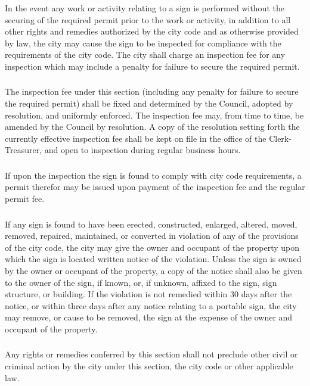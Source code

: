\subsubsection{}
In the event any work or activity relating to a sign is performed without the securing of the required permit prior to the work or activity, in addition to all other rights and remedies authorized by the city code and as otherwise provided by law, the city may cause the sign to be inspected for compliance with the requirements of the city code.  The city shall charge an inspection fee for any inspection which may include a penalty for failure to secure the required permit.
\subsubsection{}
The inspection fee under this section (including any penalty for failure to secure the required permit) shall be fixed and determined by the Council, adopted by resolution, and uniformly enforced.  The inspection fee may, from time to time, be amended by the Council by resolution.  A copy of the resolution setting forth the currently effective inspection fee shall be kept on file in the office of the Clerk-Treasurer, and open to inspection during regular business hours.
\subsubsection{}
If upon the inspection the sign is found to comply with city code requirements, a permit therefor may be issued upon payment of the inspection fee and the regular permit fee.
\subsubsection{}
If any sign is found to have been erected, constructed, enlarged, altered, moved, removed, repaired, maintained, or converted in violation of any of the provisions of the city code, the city may give the owner and occupant of the property upon which the sign is located written notice of the violation. Unless the sign is owned by the owner or occupant of the property, a copy of the notice shall also be given to the owner of the sign, if known, or, if unknown, affixed to the sign, sign structure, or building. If the violation is not remedied within 30 days after the notice, or within three days after any notice relating to a portable sign, the city may remove, or cause to be removed, the sign at the expense of the owner and occupant of the property.
\subsubsection{}
Any rights or remedies conferred by this section shall not preclude other civil or criminal action by the city under this section, the city code or other applicable law.
